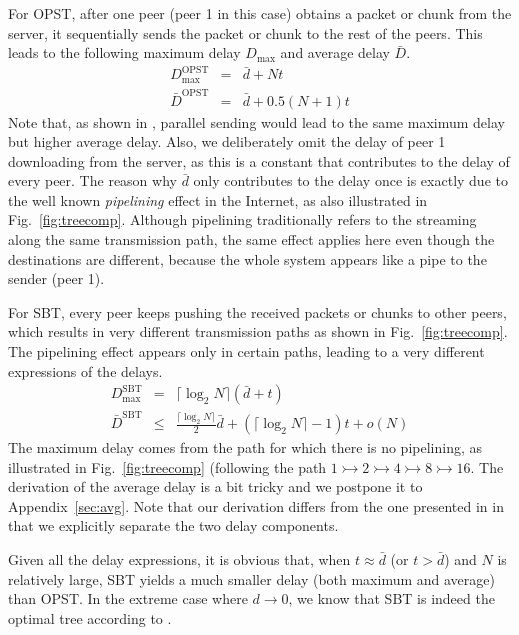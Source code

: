 \documentclass[conference]{IEEEtran}
\begin{document}
  For OPST, after one peer (peer 1 in this case) obtains a packet or chunk from the server, it sequentially sends the packet or chunk to the rest of the peers. This leads to the following maximum delay $D_{\mathrm{max}}$ and average delay $\bar{D}$.
\begin{eqnarray}
  D_{\mathrm{max}}^{\mathrm{OPST}} &=& \bar{d} + Nt \\
  \bar{D}^{\mathrm{OPST}}          &=& \bar{d} + 0.5(N+1)t
  \end{eqnarray}
Note that, as shown in \cite{Liu-MM07}, parallel sending would lead to the same maximum delay but higher average delay. Also, we deliberately omit the delay of peer 1 downloading from the server, as this is a constant that contributes to the delay of every peer. The reason why $\bar{d}$ only contributes to the delay once is exactly due to the well known \textit{pipelining} effect in the Internet, as also illustrated in Fig.~\ref{fig:treecomp}. Although pipelining traditionally refers to the streaming along the same transmission path, the same effect applies here even though the destinations are different, because the whole system appears like a pipe to the sender (peer 1).

  For SBT, every peer keeps pushing the received packets or chunks to other peers, which results in very different transmission paths as shown in Fig.~\ref{fig:treecomp}. The pipelining effect appears only in certain paths, leading to a very different expressions of the delays.
\begin{eqnarray}
  D_{\mathrm{max}}^{\mathrm{SBT}} &=& \lceil\log_2 N\rceil \left(\bar{d} + t\right) \label{exp:maxmindelay} \\
  \bar{D}^{\mathrm{SBT}}          &\leq& \frac{\lceil\log_2 N\rceil}{2}\bar{d} + \left(\lceil\log_2 N\rceil - 1\right) t + o(N) \label{exp:avgmindelay}
  \end{eqnarray}
The maximum delay comes from the path for which there is no pipelining, as illustrated in Fig.~\ref{fig:treecomp} (following the path $1 \rightarrowtail 2 \rightarrowtail 4 \rightarrowtail 8 \rightarrowtail 16$. The derivation of the average delay is a bit tricky and we postpone it to Appendix~\ref{sec:avg}. Note that our derivation differs from the one presented in \cite{Liu-MM07} in that we explicitly separate the two delay components.

  Given all the delay expressions, it is obvious that, when $t \approx \bar{d}$ (or $t > \bar{d}$) and $N$ is relatively large, SBT yields a much smaller delay (both maximum and average) than OPST. In the extreme case where $d\rightarrow0$, we know that SBT is indeed the optimal tree according to \cite{Liu-MM07}.
\end{document}
